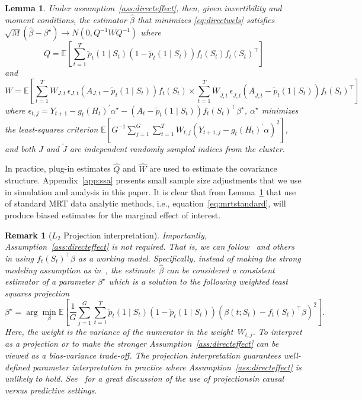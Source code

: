 \documentclass[12pt]{article}
\newtheorem{lemma}[thm]{Lemma}
\newtheorem{remark}[thm]{Remark}%
\newcommand{\zw}[1]{\textcolor{blue}{[\textit{ZW: #1}]}}
\begin{document}
\begin{lemma}
\label{lemma:asymnorm}
Under assumption~\ref{ass:directeffect}, then, given invertibility and moment conditions, the estimator $\hat \beta$ that minimizes \eqref{eq:directwcls} satisfies $\sqrt{M} \left(\hat \beta - \beta^\star \right) \to N(0, Q^{-1} W Q^{-1})$ where
$$
Q = \mathbb{E} \left[ \sum_{t=1}^T \tilde p_t( 1 \mid S_{t} ) ( 1- \tilde p_t( 1 \mid S_{t} )) f_t (S_t) f_t (S_t)^\top \right]
$$
and
$$
W =  \mathbb{E} \left[ \sum_{t=1}^T W_{J,t} \, \epsilon_{J,t} ( A_{J,t} - \tilde p_t( 1 \mid S_{t} )) f_t (S_t) \times \sum_{t=1}^T W_{\tilde J,t} \, \epsilon_{\tilde J,t} ( A_{\tilde J,t} - \tilde p_t( 1 \mid S_{t} )) f_t (S_t)^\top  \right]
$$
where $\epsilon_{t,j} = Y_{t+1} - g_t(H_t)^\prime \alpha^\star - (A_t - \tilde p_t (1 \mid S_t) ) f_t (S_t)^\top \beta^\star$, $\alpha^\star$ minimizes the least-squares criterion $\mathbb{E}  \left[G^{-1} \sum_{j=1}^G \sum_{t=1}^T W_{t,j} \left( Y_{t+1,j} - g_t(H_t)^\prime \alpha \right)^2 \right]$, and both $J$ and $\tilde J$ are independent randomly sampled indices from the cluster.
\end{lemma}

\noindent In practice, plug-in estimates $\hat Q$ and $\hat W$ are used to estimate the covariance structure. Appendix~\ref{app:ssa} presents small sample size adjustments that we use in simulation and analysis in this paper.  It is clear that from Lemma~\ref{lemma:asymnorm} that use of standard MRT data analytic methods, i.e., equation~\eqref{eq:mrtstandard}, will produce biased estimates for the marginal effect of interest.

\begin{remark}[$L_2$ Projection interpretation]
\label{rmk:l2proj}
\normalfont
Importantly, Assumption~\ref{ass:directeffect} is not required.  That is, we can follow~\cite{Neugebauer2007,Rosenblum2010,Kennedy2019,DempseyAOAS} and others in using $f_t (S_t)^\top \beta$ as a working model.  Specifically, instead of making the strong modeling assumption as in~\cite{Boruvkaetal}, the estimate~$\hat \beta$ can be considered a consistent estimator of a parameter $\beta^\star$ which is a solution to the following weighted least squares projection
$$
\beta^\star = \arg \min_{\beta} \mathbb{E} \left[ \frac{1}{G} \sum_{j=1}^G \sum_{t=1}^T \tilde p_t(1 \mid S_t) \left( 1 - \tilde p_t(1 \mid S_t) \right) \left( \beta(t; S_t) - f_t (S_t)^\top \beta \right)^2 \right].
$$
Here, the weight is the variance of the numerator in the weight~$W_{t,j}$.  To interpret as a projection or to make the stronger Assumption~\ref{ass:directeffect} can be viewed as a bias-variance trade-off.  The projection interpretation guarantees well-defined parameter interpretation in practice where Assumption~\ref{ass:directeffect} is unlikely to hold.  See~\cite[Sec. 3.1, pp.9--10]{Kennedy2019} for a great discussion of the use of projectionsin causal versus predictive settings.
\end{remark}
\end{document}
